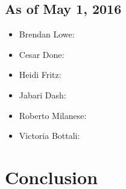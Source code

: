 \documentclass{article}
\begin{document}
			\subsection{As of May 1, 2016}
				\begin{itemize}
					\item Brendan Lowe:
					\item Cesar Done:
					\item Heidi Fritz:
					\item Jabari Dash:
					\item Roberto Milanese:
					\item Victoria Bottali:			
				\end{itemize}
			
	\newpage
	\section{Conclusion}\label{sec:conclusion}
\end{document}
